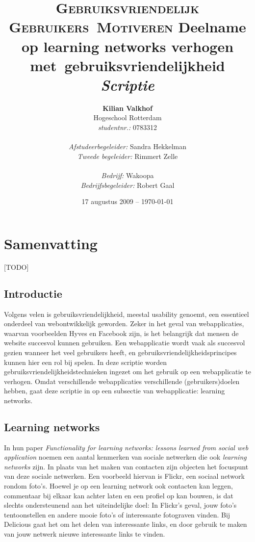 \documentclass[a4paper, 10pt, pdftex]{report}
\title{\textsc{Gebruiksvriendelijk Gebruikers~Motiveren}
  \linebreak Deelname op learning networks verhogen met~gebruiksvriendelijkheid \linebreak \linebreak \emph{Scriptie}}
\author{\textbf{Kilian Valkhof}\\
  Hogeschool Rotterdam\\
  \textit{studentnr.:} 0783312\\
  \\
  \textit{Afstudeerbegeleider:} Sandra Hekkelman\\
  \textit{Tweede begeleider:} Rimmert Zelle\\
  \\
  \textit{Bedrijf:} Wakoopa\\
  \textit{Bedrijfsbegeleider:} Robert Gaal}
\date{17 augustus 2009 -- \today}
\begin{document}
  \normalem
  \maketitle

  \newpage
  \chapter*{Samenvatting}
[TODO]

  \newpage
  \setcounter{tocdepth}{1}
  \tableofcontents

  \newpage
  \section*{Introductie}
    Volgens velen is gebruiksvriendelijkheid, meestal usability genoemt, een essentieel onderdeel van webontwikkelijk geworden. Zeker in het geval van webapplicaties, waarvan voorbeelden Hyves en Facebook zijn, is het belangrijk dat mensen de website succesvol kunnen gebruiken. Een webapplicatie wordt vaak als succesvol gezien wanneer het veel gebruikers heeft, en gebruiksvriendelijkheidsprincipes kunnen hier een rol bij spelen. In deze scriptie worden gebruiksvriendelijkheidstechnieken ingezet om het gebruik op een webapplicatie te verhogen. Omdat verschillende webapplicaties verschillende (gebruikers)doelen hebben, gaat deze scriptie in op een subsectie van webapplicatie: learning networks.

    \section{Learning networks}
            In hun paper \emph{Functionality for learning networks: lessons learned from social web application} noemen \citeauthor{Berlanga2007} een aantal kenmerken van sociale netwerken die ook \emph{learning networks} zijn. In plaats van het maken van contacten zijn objecten het focuspunt van deze sociale netwerken. Een voorbeeld hiervan is Flickr, een sociaal network rondom foto's. Hoewel je op een learning network ook contacten kan leggen, commentaar bij elkaar kan achter laten en een profiel op kan bouwen, is dat slechts ondersteunend aan het uiteindelijke doel: In Flickr's geval, jouw foto's tentoonstellen en andere mooie foto's of interessante fotograven vinden. Bij Delicious gaat het om het delen van interessante links, en door gebruik te maken van jouw netwerk nieuwe interessante links te vinden.
\end{document}
